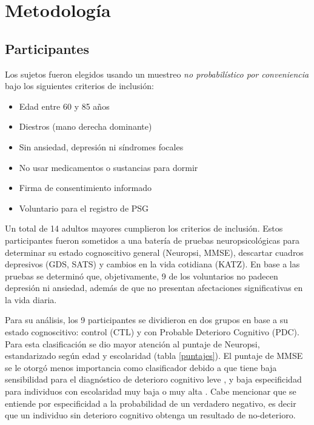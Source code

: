 
\chapter{Metodología}

\section{Participantes}

Los sujetos fueron elegidos usando un muestreo \textit{no probabilístico por conveniencia} bajo los 
siguientes criterios de inclusión:
\begin{itemize}
\item Edad entre 60 y 85 años
\item Diestros (mano derecha dominante)
\item Sin ansiedad, depresión ni síndromes focales
\item No usar medicamentos o sustancias para dormir
\item Firma de consentimiento informado
\item Voluntario para el registro de PSG
\end{itemize}

Un total de 14 adultos mayores cumplieron los criterios de inclusión. Estos participantes fueron 
sometidos a una batería de pruebas neuropsicológicas para determinar su estado cognoscitivo general 
(Neuropsi, MMSE), descartar cuadros depresivos (GDS, SATS) y cambios en la vida cotidiana (KATZ).
%
En base a las pruebas se determinó que, objetivamente, 9 de los voluntarios no padecen depresión ni 
ansiedad, además de que no presentan afectaciones significativas en la vida diaria.

Para su análisis, los 9 participantes se dividieron en dos grupos en base a su estado cognoscitivo:
control (CTL) y con Probable Deterioro Cognitivo (PDC). 
%
Para esta clasificación se dio mayor atención al puntaje de Neuropsi, estandarizado según edad y 
escolaridad (tabla \ref{puntajes}). 
%
El puntaje de MMSE se le otorgó menos importancia como clasificador debido a que tiene baja 
sensibilidad para el diagnóstico de deterioro cognitivo leve \cite{Ardila12}, y baja especificidad 
para individuos con escolaridad muy baja o muy alta \cite{Ostrosky00}.
%
Cabe mencionar que se entiende por especificidad a la probabilidad de un verdadero negativo, es 
decir que un individuo sin deterioro cognitivo obtenga un resultado de no-deterioro.

